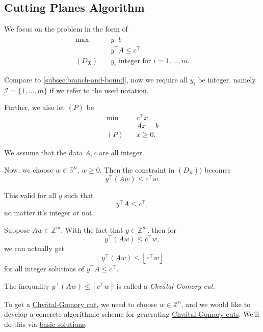 \subsection{Cutting Planes Algorithm}
We focus on the problem in the form of
\[
	\begin{aligned}
		\max~                    & y^{\top}b                                   \\
		                         & y^{\top}A\leq c^{\top}                      \\
		(D_{\mathfrak{X} })\quad & y_{i}\text{ integer for }i = 1, \ldots , m.
	\end{aligned}
\]
\begin{note}
	Compare to \autoref{subsec:branch-and-bound}, now we require all \(y_{i}\) be integer, namely \(\mathcal{I} = \{1, \ldots , m\}\)
	if we refer to the used notation.

	Further, we also let \((P)\) be
	\[
		\begin{aligned}
			\min~    & c^{\top}x \\
			         & Ax = b    \\
			(P)\quad & x\geq 0.
		\end{aligned}
	\]
\end{note}

\begin{remark}
	We assume that the data \(A, c\) are all integer.
\end{remark}

Now, we choose \(w\in \mathbb{R}^n\), \(w\geq 0\). Then the constraint in \((D_{\mathfrak{X}}))\) becomes
\[
	y^{\top}(Aw) \leq c^{\top}w.
\]
\begin{remark}
	This valid for all \(y\) such that
	\[
		y^{\top}A\leq c^{\top},
	\]
	no matter it's integer or not.
\end{remark}

Suppose \(Aw\in\mathbb{Z}^m\). With the fact that \(y\in \mathbb{Z}^m\), then for
\[
	y^{\top}(Aw)\leq c^{\top}w,
\]
we can actually get
\[
	y^{\top}(Aw)\leq \left\lfloor c^{\top}w \right\rfloor
\]
for all integer solutions of \(y^{\top} A \leq c^{\top} \).

\begin{definition}\label{def:Chvatal-Gomory-cut}
	The inequality \(y^{\top}(Aw)\leq \left\lfloor c^{\top}w \right\rfloor\) is called a \emph{Chvátal-Gomory cut}.
	\begin{center}
	\end{center}
\end{definition}
\begin{remark}
	To get a \hyperref[def:Chvatal-Gomory-cut]{Chvátal-Gomory cut}, we need to choose \(w\in \mathbb{Z} ^n\), and we would like to
	develop a concrete algorithmic scheme for generating \hyperref[def:Chvatal-Gomory-cut]{Chvátal-Gomory cuts}. We'll do this via
	\hyperref[def:basic-solution]{basic solutions}.
\end{remark}


